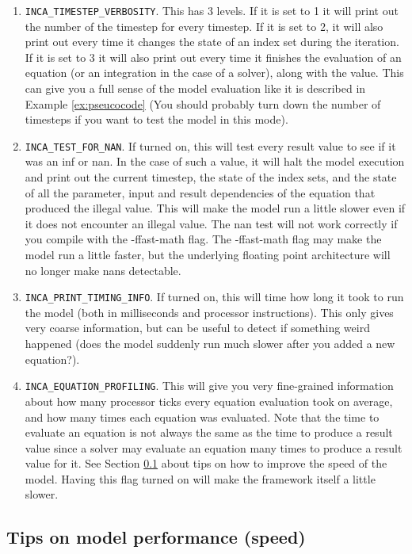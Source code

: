 \documentclass[11pt]{article}
\theoremstyle{definition}
\begin{document}
\begin{enumerate}[i]
\item {\tt INCA\_TIMESTEP\_VERBOSITY}. This has 3 levels. If it is set to 1 it will print out the number of the timestep for every timestep. If it is set to 2, it will also print out every time it changes the state of an index set during the iteration. If it is set to 3 it will also print out every time it finishes the evaluation of an equation (or an integration in the case of a solver), along with the value. This can give you a full sense of the model evaluation like it is described in Example \ref{ex:pseucocode} (You should probably turn down the number of timesteps if you want to test the model in this mode).
\item {\tt INCA\_TEST\_FOR\_NAN}. If turned on, this will test every result value to see if it was an inf or nan. In the case of such a value, it will halt the model execution and print out the current timestep, the state of the index sets, and the state of all the parameter, input and result dependencies of the equation that produced the illegal value. This will make the model run a little slower even if it does not encounter an illegal value. The nan test will not work correctly if you compile with the -ffast-math flag. The -ffast-math flag may make the model run a little faster, but the underlying floating point architecture will no longer make nans detectable.
\item {\tt INCA\_PRINT\_TIMING\_INFO}. If turned on, this will time how long it took to run the model (both in milliseconds and processor instructions). This only gives very coarse information, but can be useful to detect if something weird happened (does the model suddenly run much slower after you added a new equation?).
\item {\tt INCA\_EQUATION\_PROFILING}. This will give you very fine-grained information about how many processor ticks every equation evaluation took on average, and how many times each equation was evaluated. Note that the time to evaluate an equation is not always the same as the time to produce a result value since a solver may evaluate an equation many times to produce a result value for it. See Section \ref{sec:performance} about tips on how to improve the speed of the model. Having this flag turned on will make the framework itself a little slower.
\end{enumerate}

\subsection{Tips on model performance (speed)}\label{sec:performance}
\end{document}
